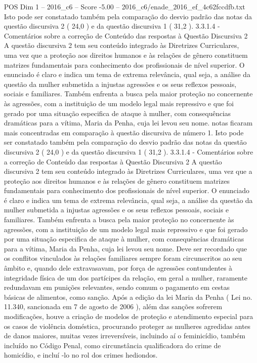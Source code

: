 \begin{textsample}{POS Dim 1 – 2016\_c6 – Score -5.00 – 2016\_c6/enade\_2016\_ef\_4c62fccdfb.txt}
Isto pode ser constatado também pela comparação do desvio padrão das notas da questão discursiva 2 ( 24,0 ) e da questão discursiva 1 ( 31,2 ). 3.3.1.4 - Comentários sobre a correção de Conteúdo das respostas à Questão Discursiva 2 A questão discursiva 2 tem seu conteúdo integrado às Diretrizes Curriculares, uma vez que a proteção aos direitos humanos e às relações de gênero constituem matrizes fundamentais para conhecimento dos profissionais de nível superior.
O enunciado é claro e indica um tema de extrema relevância, qual seja, a análise da questão da mulher submetida a injustas agressões e os seus reflexos pessoais, sociais e familiares.
Também enfrenta a busca pela maior proteção no concernente às agressões, com a instituição de um modelo legal mais repressivo e que foi gerado por uma situação especifica de ataque à mulher, com consequências dramáticas para a vítima, Maria da Penha, cuja lei levou seu nome. notas ficaram mais concentradas em comparação à questão discursiva de número 1.
Isto pode ser constatado também pela comparação do desvio padrão das notas da questão discursiva 2 ( 24,0 ) e da questão discursiva 1 ( 31,2 ). 3.3.1.4 - Comentários sobre a correção de Conteúdo das respostas à Questão Discursiva 2 A questão discursiva 2 tem seu conteúdo integrado às Diretrizes Curriculares, uma vez que a proteção aos direitos humanos e às relações de gênero constituem matrizes fundamentais para conhecimento dos profissionais de nível superior.
O enunciado é claro e indica um tema de extrema relevância, qual seja, a análise da questão da mulher submetida a injustas agressões e os seus reflexos pessoais, sociais e familiares.
Também enfrenta a busca pela maior proteção no concernente às agressões, com a instituição de um modelo legal mais repressivo e que foi gerado por uma situação especifica de ataque à mulher, com consequências dramáticas para a vítima, Maria da Penha, cuja lei levou seu nome.
Deve ser recordado que os conflitos vinculados às relações familiares sempre foram circunscritos ao seu âmbito e, quando dele extravasavam, por força de agressões contundentes à integridade física de um dos partícipes da relação, em geral a mulher, raramente redundavam em punições relevantes, sendo comum o pagamento em cestas básicas de alimentos, como sanção.
Após a edição da lei Maria da Penha ( Lei no. 11.340, sancionada em 7 de agosto de 2006 ), além das sanções sofrerem modificações, houve a criação de modelos de proteção e atendimento especial para os casos de violência doméstica, procurando proteger as mulheres agredidas antes de danos maiores, muitas vezes irreversíveis, incluindo aí o feminicídio, também incluído no Código Penal, como circunstância qualificadora do crime de homicídio, e incluí -lo no rol dos crimes hediondos.

\end{textsample}
